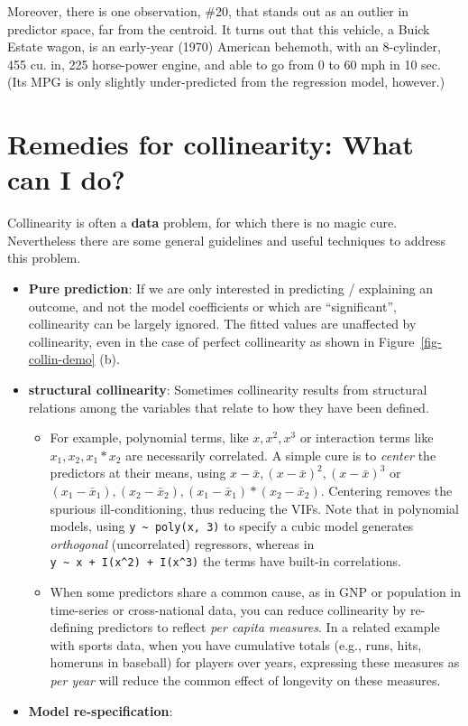 \documentclass[
  letterpaper,
  10pt,
  krantz2]{krantz}
\begin{document}
{Moreover, there is one observation, \#20, that stands out as an outlier
in predictor space, far from the centroid. It turns out that this
vehicle, a Buick Estate wagon, is an early-year (1970) American
behemoth, with an 8-cylinder, 455 cu. in, 225 horse-power engine, and
able to go from 0 to 60 mph in 10 sec. (Its MPG is only slightly
under-predicted from the regression model, however.)

\section{Remedies for collinearity: What can I do?}\label{sec-remedies}

Collinearity is often a \textbf{data} problem, for which there is no
magic cure. Nevertheless there are some general guidelines and useful
techniques to address this problem.

\begin{itemize}
\item
  \textbf{Pure prediction}: If we are only interested in predicting /
  explaining an outcome, and not the model coefficients or which are
  ``significant'', collinearity can be largely ignored. The fitted
  values are unaffected by collinearity, even in the case of perfect
  collinearity as shown in Figure~\ref{fig-collin-demo} (b).
\item
  \textbf{structural collinearity}: Sometimes collinearity results from
  structural relations among the variables that relate to how they have
  been defined.

  \begin{itemize}
  \item
    For example, polynomial terms, like \(x, x^2, x^3\) or interaction
    terms like \(x_1, x_2, x_1 * x_2\) are necessarily correlated. A
    simple cure is to \emph{center} the predictors at their means, using
    \(x - \bar{x}, (x - \bar{x})^2, (x - \bar{x})^3\) or
    \((x_1 - \bar{x}_1), (x_2 - \bar{x}_2), (x_1 - \bar{x}_1) * (x_2 - \bar{x}_2)\).
    Centering removes the spurious ill-conditioning, thus reducing the
    VIFs. Note that in polynomial models, using
    \texttt{y\ \textasciitilde{}\ poly(x,\ 3)} to specify a cubic model
    generates \emph{orthogonal} (uncorrelated) regressors, whereas in
    \texttt{y\ \textasciitilde{}\ x\ +\ I(x\^{}2)\ +\ I(x\^{}3)} the
    terms have built-in correlations.
  \item
    When some predictors share a common cause, as in GNP or population
    in time-series or cross-national data, you can reduce collinearity
    by re-defining predictors to reflect \emph{per capita measures}. In
    a related example with sports data, when you have cumulative totals
    (e.g., runs, hits, homeruns in baseball) for players over years,
    expressing these measures as \emph{per year} will reduce the common
    effect of longevity on these measures.
  \end{itemize}
\item
  \textbf{Model re-specification}:


\end{itemize}}
\end{document}
